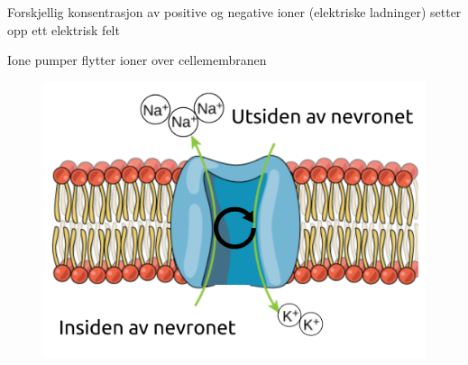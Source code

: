 \documentclass[presentation]{beamer}
\begin{document}
\begin{frame}{Forskjellig konsentrasjon av positive og negative ioner (elektriske ladninger) setter opp ett elektrisk felt}
\begin{overlayarea}{\textwidth}{\textheight}
\begin{figure}
\end{figure}
\end{overlayarea}
\end{frame}


\begin{frame}{Ione pumper flytter ioner over cellemembranen}
   \begin{figure}
       {\includegraphics[width=1\textwidth]{ion_pump2.png}}
\end{figure}
\end{frame}
\end{document}
